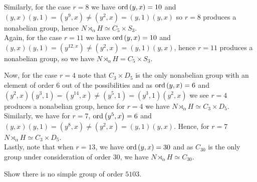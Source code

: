 \documentclass[a4paper]{article}
\begin{document}
\begin{solution}
\begin{enumerate}
				Similarly, for the case \(r = 8\) we have \(\operatorname{ord}\left( y, x \right)  = 10\) and \(\left( y, x \right) \left( y, 1 \right) = \left( y^{9}, x \right) \neq \left( y^2, x \right)  = \left( y, 1 \right) \left( y, x \right)  \) so \(r = 8\) produces a nonabelian group, hence \(N\rtimes_{\alpha} H \simeq C_5 \times S_3\).\\

				Again, for the case \(r = 11\) we have \(\operatorname{ord}\left( y, x \right)  = 10\) and \(\left( y, x \right) \left( y, 1 \right)  = \left( y^{12, x} \right) \neq \left( y^2, x \right)  = \left( y, 1 \right) \left( y, x \right)  \), hence \(r = 11\) produces a nonabelian group, so we have \(N \rtimes_{\alpha} H = C_5 \times S_3\).

				Now, for the case \(r = 4\) note that \(C_3 \times D_5\) is the only nonabelian group with an element of order \(6\) out of the possibilities and as \(\operatorname{ord}\left( y, x \right) =6\) and \(\left( y^2, x \right) \left( y^3, 1 \right) = \left( y^{14}, x \right) \neq \left( y^{5}, 1 \right) = \left( y^3, 1 \right) \left( y^2, x \right)   \) we see \(r = 4\) produces a nonabelian group, hence for \(r = 4\) we have \(N \rtimes_{\alpha} H \simeq C_3 \times D_5\).\\

				Similarly, we have for \(r = 7\), \(\operatorname{ord}\left( y^{5}, x \right) = 6 \) and \(\left( y, x \right) \left( y, 1 \right)  =\left( y^{8}, x \right)\neq \left( y^2, x \right)  = \left( y, 1 \right) \left( y ,x \right)  \). Hence, for \(r = 7\) \(N \rtimes_{\alpha} H \simeq C_3 \times D_5\).\\

				Lastly, note that when \(r = 13\), we have \(\operatorname{ord}\left( y, x \right)  = 30\) and as \(C_{30}\) is the only group under consideration of order \(30\), we have \(N\rtimes_{\alpha} H \simeq C_{30}\).
	\end{enumerate}
\end{solution}
\newpage
\begin{problem}[4]
	Show there is no simple group of order \(5103\).
\end{problem}
\end{document}
